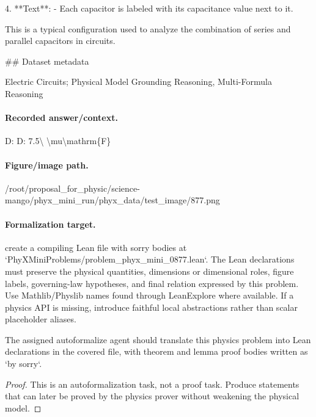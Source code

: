 4. **Text**:
   - Each capacitor is labeled with its capacitance value next to it.

This is a typical configuration used to analyze the combination of series and parallel capacitors in circuits.

\#\# Dataset metadata

Electric Circuits; Physical Model Grounding Reasoning, Multi-Formula Reasoning

\paragraph{Recorded answer/context.}
D: D: 7.5\textbackslash{} \textbackslash{}mu\textbackslash{}mathrm\{F\}

\paragraph{Figure/image path.}
/root/proposal\_for\_physic/science-mango/phyx\_mini\_run/phyx\_data/test\_image/877.png

\paragraph{Formalization target.}
create a compiling Lean file with sorry bodies at `PhyXMiniProblems/problem\_phyx\_mini\_0877.lean`. The Lean declarations must preserve the physical quantities, dimensions or dimensional roles, figure labels, governing-law hypotheses, and final relation expressed by this problem.
Use Mathlib/Physlib names found through LeanExplore where available. If a physics API is missing, introduce faithful local abstractions rather than scalar placeholder aliases.

\begin{theorem}
\label{thm:physics:phyx_mini_0877:target}
The assigned autoformalize agent should translate this physics problem into Lean declarations in the covered file, with theorem and lemma proof bodies written as `by sorry`.
\end{theorem}
\begin{proof}
This is an autoformalization task, not a proof task. Produce statements that can later be proved by the physics prover without weakening the physical model.
\end{proof}


